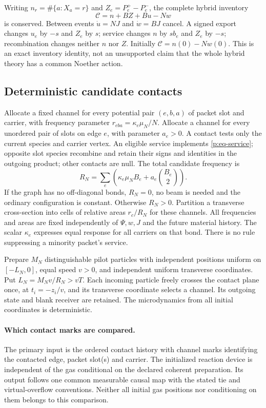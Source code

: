 \documentclass[11pt,oneside,openany]{book}
\theoremstyle{definition}
\theoremstyle{remark}\newtheorem{remark}[theorem]{Remark}
\begin{document}
Writing $n_r=\#\{a:X_a=r\}$ and $Z_e=P_e^+-P_e^-$, the complete hybrid inventory
\begin{equation}
 \mathcal C=n+BZ+Bu-Nw
 \label{p:eq-charge}
\end{equation}
is conserved. Between events $\dot u=NJ$ and $\dot w=BJ$ cancel. A signed export changes $u_e$ by $-s$ and $Z_e$ by $s$; service changes $n$ by $sb_e$ and $Z_e$ by $-s$; recombination changes neither $n$ nor $Z$. Initially $\mathcal C=n(0)-Nw(0)$. This is an exact inventory identity, not an unsupported claim that the whole hybrid theory has a common Noether action.

\subsection{Deterministic candidate contacts}
Allocate a fixed channel for every potential pair $(e,b,a)$ of packet slot and carrier, with frequency parameter $r_{eba}=\kappa_e\mu_N/N$. Allocate a channel for every unordered pair of slots on edge $e$, with parameter $a_e>0$. A contact tests only the current species and carrier vertex. An eligible service implements \eqref{p:eq-service}; opposite slot species recombine and retain their signs and identities in the outgoing product; other contacts are null. The total candidate frequency is
\begin{equation}
 R_N=\sum_e\left(\kappa_e\mu_NB_e+a_e\binom{B_e}{2}\right).
 \label{p:eq-candidate}
\end{equation}
If the graph has no off-diagonal bonds, $R_N=0$, no beam is needed and the ordinary configuration is constant. Otherwise $R_N>0$. Partition a transverse cross-section into cells of relative areas $r_c/R_N$ for these channels. All frequencies and areas are fixed independently of $\Psi,w,J$ and the future material history. The scalar $\kappa_e$ expresses equal response for all carriers on that bond. There is no rule suppressing a minority packet's service.

Prepare $M_N$ distinguishable pilot particles with independent positions uniform on $[-L_N,0]$, equal speed $v>0$, and independent uniform transverse coordinates. Put $L_N=M_Nv/R_N>vT$. Each incoming particle freely crosses the contact plane once, at $t_i=-z_i/v$, and its transverse coordinate selects a channel. Its outgoing state and blank receiver are retained. The microdynamics from all initial coordinates is deterministic.

\paragraph{Which contact marks are compared.}
The primary input is the ordered contact history with channel marks
identifying the contacted edge, packet slot(s) and carrier.  The initialized
reaction device is independent of the gas conditional on the declared
coherent preparation.  Its output follows one common measurable causal
map with the stated tie and virtual-overflow conventions.  Neither all
initial gas positions nor conditioning on them belongs to this comparison.
\end{document}
